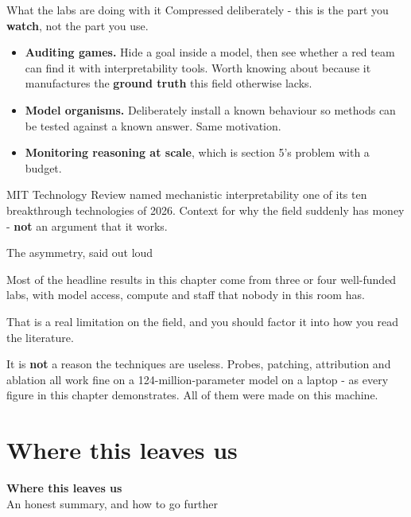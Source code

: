 \documentclass[aspectratio=169]{beamer}
\newcommand{\trapbox}[1]{%
  \begin{tcolorbox}[colback=armred!8, colframe=armred, boxrule=0.6pt, arc=2pt]
  #1
  \end{tcolorbox}}
\newcommand{\takebox}[1]{%
  \begin{tcolorbox}[colback=paramgreen!8, colframe=paramgreen, boxrule=0.6pt, arc=2pt]
  #1
  \end{tcolorbox}}
\newcommand{\sectiontransition}[2]{%
  \begin{frame}[plain]
    \vfill
    \begin{center}
      {\Huge\bfseries\color{popblue} #1}\\[1.1em]
      {\large #2}
    \end{center}
    \vfill
  \end{frame}}
\begin{document}
\begin{frame}{What the labs are doing with it}
  \vspace{0.6em}
  Compressed deliberately - this is the part you \textbf{watch}, not the part you use.

  \vspace{0.6em}
  \begin{itemize}
    \item \textbf{Auditing games.} Hide a goal inside a model, then see whether a red team can
      find it with interpretability tools. Worth knowing about because it manufactures the
      \textbf{ground truth} this field otherwise lacks.
    \item \textbf{Model organisms.} Deliberately install a known behaviour so methods can be
      tested against a known answer. Same motivation.
    \item \textbf{Monitoring reasoning at scale}, which is section 5's problem with a budget.
  \end{itemize}

  \vspace{0.7em}
  {\footnotesize MIT Technology Review named mechanistic interpretability one of its ten
  breakthrough technologies of 2026. Context for why the field suddenly has money - \textbf{not}
  an argument that it works.}
\end{frame}

\begin{frame}{The asymmetry, said out loud}
  \vspace{1.0em}
  \trapbox{Most of the headline results in this chapter come from three or four well-funded labs,
  with model access, compute and staff that nobody in this room has.}

  \vspace{1.0em}
  That is a real limitation on the field, and you should factor it into how you read the
  literature.

  \vspace{1.0em}
  \takebox{It is \textbf{not} a reason the techniques are useless. Probes, patching, attribution
  and ablation all work fine on a 124-million-parameter model on a laptop - as every figure in
  this chapter demonstrates. All of them were made on this machine.}
\end{frame}

\section{Where this leaves us}
\sectiontransition{Where this leaves us}{An honest summary, and how to go further}
\end{document}
